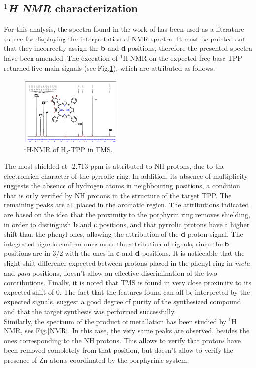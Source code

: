 \documentclass[twoside,twocolumn,9pt]{article}
\begin{document}
\subsection{\textit{$^{1}$H NMR} characterization}
For this analysis, the spectra found in the work of \citet{anjali_zinc-tetraphenylporphyrin_2020} has been used as a literature source for displaying the interpretation of NMR spectra.
It must be pointed out that they incorrectly assign the \textbf{b} and \textbf{d} positions, therefore the presented spectra have been amended.
The execution of $^{1}$H NMR on the expected free base TPP returned five main signals (see Fig.\ref{H2-TPP-NMR}), which are attributed as follows.
\begin{figure}
	\centering
	\includegraphics[width=0.45\textwidth]{1H-NMR-H2-TPP}
	\caption{$^{1}$H-NMR of H$_{2}$-TPP in TMS.}
	\label{H2-TPP-NMR}
\end{figure}
The most shielded at -2.713 ppm is attributed to NH protons, due to the electronrich character of the pyrrolic ring. 
In addition, its absence of multiplicity suggests the absence of hydrogen atoms in neighbouring positions, a condition that is only verified by NH protons in the structure of the target TPP.
The remaining peaks are all placed in the aromatic region.
The attributions indicated are based on the idea that the proximity to the porphyrin ring removes shielding, in order to distinguish  \textbf{b} and  \textbf{c} positions, and that pyrrolic protons have a higher shift than the phenyl ones, allowing the attribution of the \textbf{d} proton signal.
The integrated signals confirm once more the attribution of signals, since the \textbf{b} positions are in 3/2 with the ones in \textbf{c} and \textbf{d} positions.
It is noticeable that the slight shift difference expected between protons placed in the phenyl ring in \textit{meta} and \textit{para} positions, doesn't allow an effective discrimination of the two contributions.
Finally, it is noted that TMS is found in very close proximity to its expected shift of 0.
The fact that the features found can all be interpreted by the expected signals, suggest a good degree of purity of the synthesized compound and that the target synthesis was performed successfully.\\
Similarly, the spectrum of the product of metallation has been studied by $^{1}$H NMR, see Fig.\ref{NMR}.
In this case, the very same peaks are observed, besides the ones corresponding to the NH protons.
This allows to verify that protons have been removed completely from that position, but doesn't allow to verify the presence of Zn atoms coordinated by the porphyrinic system.
\end{document}
